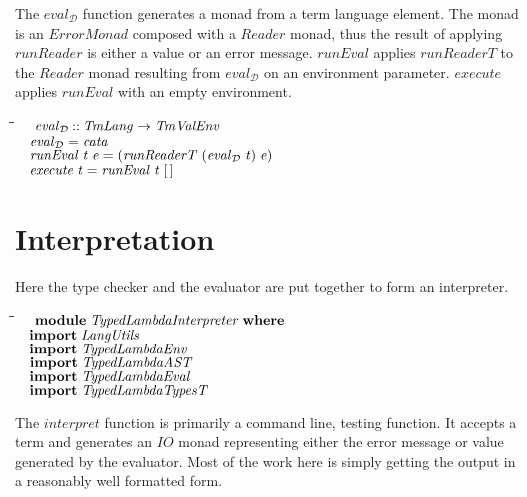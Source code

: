 \documentclass[10pt]{article}
\newlength{\lwidth}\setlength{\lwidth}{4.5cm}
\newlength{\cwidth}\setlength{\cwidth}{8mm} %
\newcommand{\Conid}[1]{\mathit{#1}}
\newcommand{\Varid}[1]{\mathit{#1}}
\begin{document}
The \ensuremath{\Varid{eval}_{\mathcal D}} function generates a monad from a term language element.
The monad is an \ensuremath{\Conid{ErrorMonad}} composed with a \ensuremath{\Conid{Reader}} monad, thus the
result of applying \ensuremath{\Varid{runReader}} is either a value or an error message.
\ensuremath{\Varid{runEval}} applies \ensuremath{\Varid{runReaderT}} to the \ensuremath{\Conid{Reader}} monad resulting from
\ensuremath{\Varid{eval}_{\mathcal D}} on an environment parameter.  \ensuremath{\Varid{execute}} applies \ensuremath{\Varid{runEval}} with
an empty environment.

\begin{tabbing}
\qquad\=\hspace{\lwidth}\=\hspace{\cwidth}\=\+\kill
${\hskip1.00em\relax\Varid{eval}_{\mathcal D}\mathbin{::}\Conid{TmLang}\to \Conid{TmValEnv}}$\\
${\hskip1.00em\relax\Varid{eval}_{\mathcal D}\mathrel{=}\Varid{cata}}$\\
${}$\\
${\hskip1.00em\relax\Varid{runEval}\;\Varid{t}\;\Varid{e}\mathrel{=}(\Varid{runReaderT}\;(\Varid{eval}_{\mathcal D}\;\Varid{t})\;\Varid{e})}$\\
${}$\\
${\hskip1.00em\relax\Varid{execute}\;\Varid{t}\mathrel{=}\Varid{runEval}\;\Varid{t}\;[\mskip1.5mu \mskip1.5mu]}$
\end{tabbing}
\section{Interpretation}

Here the type checker and the evaluator are put together to form an
interpreter.

\begin{tabbing}
\qquad\=\hspace{\lwidth}\=\hspace{\cwidth}\=\+\kill
${\hskip1.00em\relax\mathbf{module}\;\Conid{TypedLambdaInterpreter}\;\mathbf{where}}$\\
${}$\\
${\hskip1.00em\relax\mathbf{import}\;\Conid{LangUtils}}$\\
${\hskip1.00em\relax\mathbf{import}\;\Conid{TypedLambdaEnv}}$\\
${\hskip1.00em\relax\mathbf{import}\;\Conid{TypedLambdaAST}}$\\
${\hskip1.00em\relax\mathbf{import}\;\Conid{TypedLambdaEval}}$\\
${\hskip1.00em\relax\mathbf{import}\;\Conid{TypedLambdaTypesT}}$
\end{tabbing}
The \ensuremath{\Varid{interpret}} function is primarily a command line, testing
function.  It accepts a term and generates an \ensuremath{\Conid{IO}} monad representing
either the error message or value generated by the evaluator.  Most of
the work here is simply getting the output in a reasonably well
formatted form.
\end{document}
